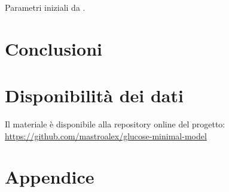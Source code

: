 Parametri iniziali da \cite{pacini_minmod_1986}.

\textcolor{blue}{\lipsum[1-2]}

\section{Conclusioni}

\textcolor{blue}{\lipsum[1]}

\raggedbottom
\section*{Disponibilità dei dati}

Il materiale è disponibile alla repository online del progetto: \url{https://github.com/mastroalex/glucose-minimal-model}


\raggedbottom
\pagebreak
\printbibliography[title=Riferimenti]

\clearpage
\onecolumn
\section*{Appendice}



